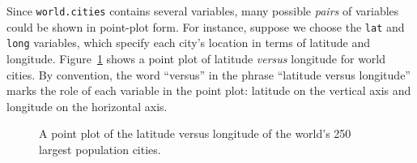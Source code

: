 \documentclass[
  letterpaper,
  DIV=11,
  numbers=noendperiod,
  oneside]{scrartcl}
\begin{document}
\begin{table}

\caption{\label{tbl-world-cities}Basic data on cities in the
\texttt{maps::world.cities} data frame}


\end{table}%

Since \texttt{world.cities} contains several variables, many possible
\emph{pairs} of variables could be shown in point-plot form. For
instance, suppose we choose the \texttt{lat} and \texttt{long}
variables, which specify each city's location in terms of latitude and
longitude. Figure~\ref{fig-world-cities} shows a point plot of latitude
\emph{versus} longitude for world cities. By convention, the word
``versus'' in the phrase ``latitude versus longitude'' marks the role of
each variable in the point plot: latitude on the vertical axis and
longitude on the horizontal axis.

\begin{figure}


\caption{\label{fig-world-cities}A point plot of the latitude versus
longitude of the world's 250 largest population cities.}

\end{figure}%
\end{document}
